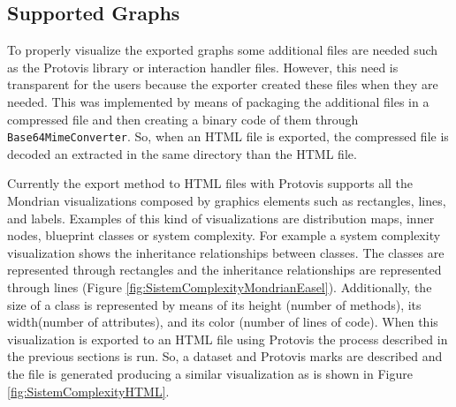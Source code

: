 \documentclass[preprint,10pt]{sigplanconf}
\newcommand{\ct}{\lstinline[backgroundcolor=\color{white},basicstyle=\footnotesize\ttfamily]}
\begin{document}
\subsection{Supported Graphs}

To properly visualize the exported graphs some additional files are needed such as the Protovis library or interaction handler files. However, this need is transparent for the users because the exporter created these files when they are needed. This was implemented by means of packaging the additional files in a compressed file and then creating a binary code of them through \ct{Base64MimeConverter}. So, when an HTML file is exported, the compressed file is decoded an extracted in the same directory than the HTML file. 

Currently the export method to HTML files with Protovis supports all the Mondrian visualizations composed by graphics elements such as rectangles, lines, and labels. Examples of this kind of visualizations are distribution maps, inner nodes, blueprint classes or system complexity. 
For example a system complexity visualization shows the inheritance relationships between classes. The classes are represented through rectangles and the inheritance relationships are represented through lines (Figure \ref{fig:SistemComplexityMondrianEasel}). Additionally, the size of a class is represented by means of its height (number of methods), its width(number of attributes), and its color (number of lines of code). When this visualization is exported to an HTML file using Protovis the process described in the previous sections is run. So, a dataset and Protovis marks are described and the file is generated producing a similar visualization as is shown in Figure \ref{fig:SistemComplexityHTML}.
\end{document}
